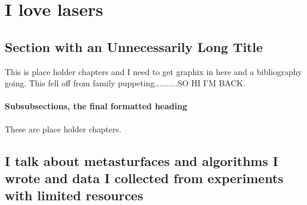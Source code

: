 \chapter{I love lasers}



\section[I love waves]{Section with an Unnecessarily Long Title}

This is place holder chapters and I need to get graphix in here and a bibliography going. This fell off from family puppeting..........SO HI I'M BACK. 

\subsubsection{Subsubsections, the final formatted heading}

These are place holder chapters. 

\section{I talk about metasturfaces and algorithms I wrote and data I collected from experiments with limited resources}

